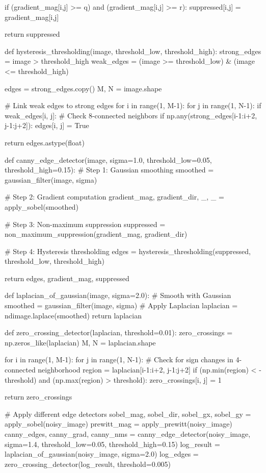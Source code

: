 \documentclass[a4paper, 11pt]{article}
\begin{document}
\begin{pycode}
            if (gradient_mag[i,j] >= q) and (gradient_mag[i,j] >= r):
                suppressed[i,j] = gradient_mag[i,j]

    return suppressed

def hysteresis_thresholding(image, threshold_low, threshold_high):
    strong_edges = image > threshold_high
    weak_edges = (image >= threshold_low) & (image <= threshold_high)

    edges = strong_edges.copy()
    M, N = image.shape

    # Link weak edges to strong edges
    for i in range(1, M-1):
        for j in range(1, N-1):
            if weak_edges[i, j]:
                # Check 8-connected neighbors
                if np.any(strong_edges[i-1:i+2, j-1:j+2]):
                    edges[i, j] = True

    return edges.astype(float)

def canny_edge_detector(image, sigma=1.0, threshold_low=0.05, threshold_high=0.15):
    # Step 1: Gaussian smoothing
    smoothed = gaussian_filter(image, sigma)

    # Step 2: Gradient computation
    gradient_mag, gradient_dir, _, _ = apply_sobel(smoothed)

    # Step 3: Non-maximum suppression
    suppressed = non_maximum_suppression(gradient_mag, gradient_dir)

    # Step 4: Hysteresis thresholding
    edges = hysteresis_thresholding(suppressed, threshold_low, threshold_high)

    return edges, gradient_mag, suppressed

def laplacian_of_gaussian(image, sigma=2.0):
    # Smooth with Gaussian
    smoothed = gaussian_filter(image, sigma)
    # Apply Laplacian
    laplacian = ndimage.laplace(smoothed)
    return laplacian

def zero_crossing_detector(laplacian, threshold=0.01):
    zero_crossings = np.zeros_like(laplacian)
    M, N = laplacian.shape

    for i in range(1, M-1):
        for j in range(1, N-1):
            # Check for sign changes in 4-connected neighborhood
            region = laplacian[i-1:i+2, j-1:j+2]
            if (np.min(region) < -threshold) and (np.max(region) > threshold):
                zero_crossings[i, j] = 1

    return zero_crossings

# Apply different edge detectors
sobel_mag, sobel_dir, sobel_gx, sobel_gy = apply_sobel(noisy_image)
prewitt_mag = apply_prewitt(noisy_image)
canny_edges, canny_grad, canny_nms = canny_edge_detector(noisy_image, sigma=1.4,
                                                           threshold_low=0.05, threshold_high=0.15)
log_result = laplacian_of_gaussian(noisy_image, sigma=2.0)
log_edges = zero_crossing_detector(log_result, threshold=0.005)


\end{pycode}
\end{document}
